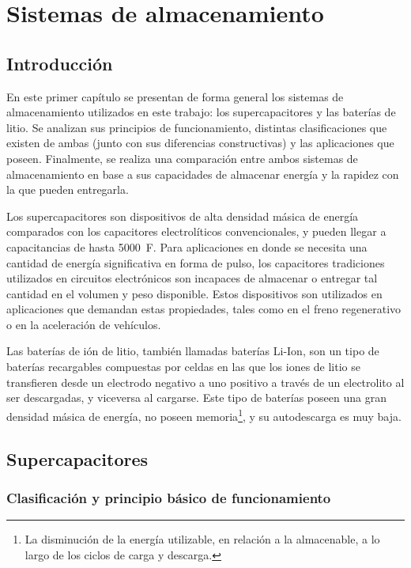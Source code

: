 \chapter{Sistemas de almacenamiento}

\section{Introducción}

En este primer capítulo se presentan de forma general los sistemas de almacenamiento utilizados en este trabajo: los supercapacitores y las baterías de litio. Se analizan sus principios de funcionamiento, distintas clasificaciones que existen de ambas (junto con sus diferencias constructivas) y las aplicaciones que poseen. Finalmente, se realiza una comparación entre ambos sistemas de almacenamiento en base a sus capacidades de almacenar energía y la rapidez con la que pueden entregarla. 

Los supercapacitores son dispositivos de alta densidad másica de energía comparados con los capacitores electrolíticos convencionales, y pueden llegar a capacitancias de hasta \SI{5000}{\farad}. Para aplicaciones en donde se necesita una cantidad de energía significativa en forma de pulso, los capacitores tradiciones utilizados en circuitos electrónicos son incapaces de almacenar o entregar tal cantidad en el volumen y peso disponible. Estos dispositivos son utilizados en aplicaciones que demandan estas propiedades, tales como en el freno regenerativo o en la aceleración de vehículos.

Las baterías de ión de litio, también llamadas baterías Li-Ion, son un tipo de baterías recargables compuestas por celdas en las que los iones de litio se transfieren desde un electrodo negativo a uno positivo a través de un electrolito al ser descargadas, y viceversa al cargarse.  Este tipo de baterías poseen una gran densidad másica de energía, no poseen memoria\footnote{La disminución de la energía utilizable, en relación a la almacenable, a lo largo de los ciclos de carga y descarga.}, y su autodescarga es muy baja.

\section{Supercapacitores}

\subsection{Clasificación y principio básico de funcionamiento}

